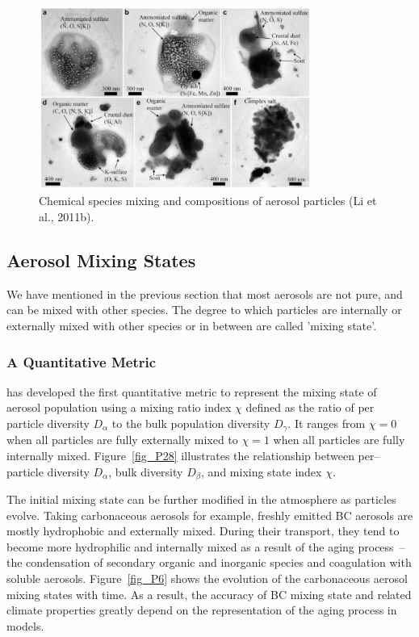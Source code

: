 \documentclass[12pt, fullpage]{uiucthesis2009_2}
\begin{document}
		\begin{figure}[h] 
			\begin{center}
				\includegraphics[width = 0.8\textwidth]{Figure05}
				\caption[Chemical species mixing and compositions of aerosol particles, taken from the . (Li et al., 2011b)]{\label{fig_P5} Chemical species mixing and compositions of aerosol particles (Li et al., 2011b).}
			\end{center}
		\end{figure}
	
	
	\subsection{Aerosol Mixing States}
	We have mentioned in the previous section that most aerosols are not pure, and can be mixed with other species. The degree to which particles are internally or externally mixed with other species or in between are called 'mixing state'.  

	\subsubsection{A Quantitative Metric}
	\citet{Riemer2013} has developed the first quantitative metric to represent the mixing state of aerosol population using a mixing ratio index $\chi$ defined as the ratio of per particle diversity $D_{\alpha}$ to the bulk population diversity $D_{\gamma}$. It ranges from $\chi = 0$ when all particles are fully externally mixed to $\chi = 1$ when all particles are fully internally mixed. Figure~\ref{fig_P28} illustrates the relationship between per--particle diversity $D_{\alpha}$, bulk diversity $D_{\beta}$, and mixing state index $\chi$.
	
	The initial mixing state can be further modified in the atmosphere as particles evolve. Taking carbonaceous aerosols for example, freshly emitted BC aerosols are mostly hydrophobic and externally mixed. During their transport, they tend to become more hydrophilic and internally mixed as a result of the aging process~--the condensation of secondary organic and inorganic species and coagulation with soluble aerosols. Figure~\ref{fig_P6} shows the evolution of the carbonaceous aerosol mixing states with time. As a result, the accuracy of BC mixing state and related climate properties greatly depend on the representation of the aging process in models.
	
\end{document}
